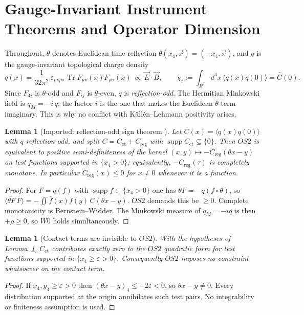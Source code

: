 \documentclass[11pt,a4paper]{article}
\def\R{R}\def\N{N}\def\Q{Q}\def\Z{Z}\def\Class{C}\def\OS{OS}\def\Gap{Gap}%
\theoremstyle{plain}
\newtheorem{lemma}[theorem]{Lemma}
\theoremstyle{definition}
\theoremstyle{remark}
\newcommand{\R}{\mathbb{R}}\newcommand{\N}{\mathbb{N}}\newcommand{\Q}{\mathbb{Q}}
\newcommand{\Z}{\mathbb{Z}}\newcommand{\Spec}{\operatorname{Spec}}
\newcommand{\OS}{\mathrm{OS}}\newcommand{\Gap}{\mathrm{Gap}}
\newcommand{\Class}{\mathcal{C}}\newcommand{\Htot}{\mathcal{H}}
\newcommand{\Chit}{\chi_t}
\renewcommand{\_}{\oldunderscore\allowbreak}
\begin{document}
\section{Gauge-Invariant Instrument Theorems and Operator Dimension}\label{sec:gaugeinv}
Throughout, $\theta$ denotes Euclidean time reflection $\theta(x_4,\vec x)=(-x_4,\vec x)$, and
$q$ is the gauge-invariant topological charge density
\[
q(x)=\frac1{32\pi^2}\,\varepsilon_{\mu\nu\rho\sigma}\operatorname{Tr}
F_{\mu\nu}(x)F_{\rho\sigma}(x)\ \propto\ \vec E\cdot\vec B,
\qquad
\Chit:=\int_{\R^4}d^4x\,\langle q(x)q(0)\rangle=\widehat C(0).
\]
Since $F_{4i}$ is $\theta$-odd and $F_{ij}$ is $\theta$-even, $q$ is \emph{reflection-odd}. The
Hermitian Minkowski field is $q_M=-i\,q$; the factor $i$ is the one that makes the Euclidean
$\theta$-term imaginary. This is why no conflict with K\"all\'en--Lehmann positivity arises.
\begin{lemma}[Imported: reflection-odd sign theorem \cite{Horvath2005,Vicari1999,Chowdhury2015}]
\label{lem:odd}
Let $C(x)=\langle q(x)q(0)\rangle$ with $q$ reflection-odd, and split
$C=C_{\mathrm{ct}}+C_{\mathrm{reg}}$ with $\operatorname{supp}C_{\mathrm{ct}}\subseteq\{0\}$.
Then $\OS2$ is equivalent to positive semi-definiteness of the kernel
$(x,y)\mapsto-C_{\mathrm{reg}}(\theta x-y)$ on test functions supported in $\{x_4>0\}$; equivalently, $-C_{\mathrm{reg}}(\tau)$ is completely monotone. In particular
$C_{\mathrm{reg}}(x)\le0$ for $x\neq0$ whenever it is a function.
\end{lemma}
\begin{proof}
For $F=q(f)$ with $\operatorname{supp}f\subset\{x_4>0\}$ one has $\theta F=-q(f\circ\theta)$, so
$\langle\overline{\theta F}\,F\rangle=-\iint\bar f(x)f(y)\,C(\theta x-y)$. $\OS2$ demands this be
$\ge0$. Complete monotonicity is Bernstein--Widder. The Minkowski measure of $q_M=-iq$ is then
$+\rho\ge0$, so $W0$ holds simultaneously.
\end{proof}
\begin{lemma}[Contact terms are invisible to $\OS2$]\label{lem:invisible}
With the hypotheses of Lemma~\ref{lem:odd}, $C_{\mathrm{ct}}$ contributes \emph{exactly zero}
to the $\OS2$ quadratic form for test functions supported in $\{x_4\ge\varepsilon>0\}$.
Consequently $\OS2$ imposes \emph{no constraint whatsoever} on the contact term.
\end{lemma}
\begin{proof}
If $x_4,y_4\ge\varepsilon>0$ then $(\theta x-y)_4\le-2\varepsilon<0$, so $\theta x-y\neq0$. Every
distribution supported at the origin annihilates such test pairs. No integrability or finiteness
assumption is used.
\end{proof}
\end{document}
